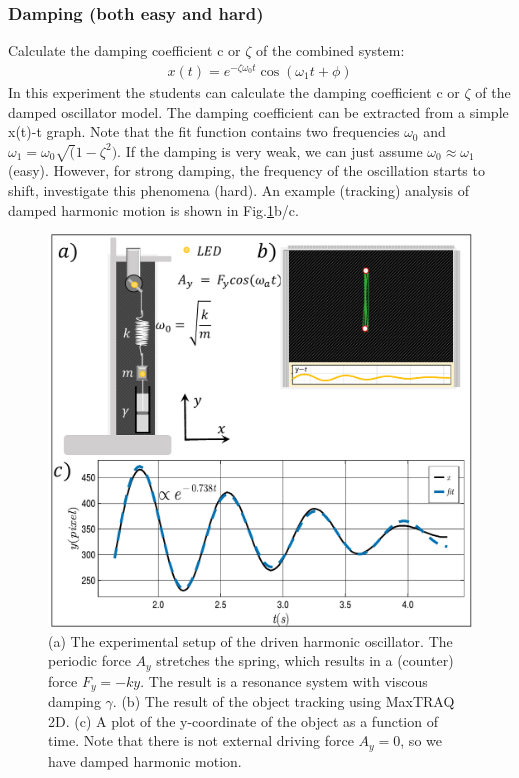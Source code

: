 \documentclass{article}
\begin{document}
\subsubsection{Damping (both easy and hard)}    
Calculate the damping coefficient c or $\zeta$ of the combined system:
\begin{align}
    x(t) = e^{-\zeta\omega_0 t}\cos(\omega_1t + \phi)
\end{align}
In this experiment the students can calculate the damping coefficient c or $\zeta$ of the damped oscillator model. The damping coefficient can be extracted from a simple x(t)-t graph. Note that the fit function contains two frequencies $\omega_0$ and $\omega_1 = \omega_0\sqrt(1-\zeta^2)$. If the damping is very weak, we can just assume $\omega_0\approx\omega_1$ (easy). However, for strong damping, the frequency of the oscillation starts to shift, investigate this phenomena (hard). An example (tracking) analysis of damped harmonic motion is shown in Fig.\ref{Figure: DDHM}b/c. 

\begin{figure}
    \includegraphics[width=12 cm]{figures/Damped Harmonic Motion.pdf}
    \caption{(a) The experimental setup of the driven harmonic oscillator. The periodic force $A_y$ stretches the spring, which results in a (counter) force $F_y = -ky$. The result is a resonance system with viscous damping $\gamma$. (b) The result of the object tracking using MaxTRAQ 2D. (c) A plot of the y-coordinate of the object as a function of time. Note that there is not external driving force $A_y=0$, so we have damped harmonic motion.}
    \label{Figure: DDHM}
\end{figure}
\end{document}
